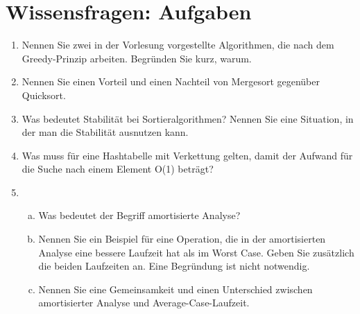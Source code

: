 \documentclass{scrartcl}
\begin{document}
\section*{Wissensfragen: Aufgaben}
\begin{enumerate}[(1)]

\item Nennen Sie zwei in der Vorlesung vorgestellte Algorithmen, die nach dem Greedy-Prinzip arbeiten. Begründen Sie kurz, warum.

\item Nennen Sie einen Vorteil und einen Nachteil von Mergesort gegenüber Quicksort.

\item Was bedeutet Stabilität bei Sortieralgorithmen? Nennen Sie eine Situation, in der man die Stabilität ausnutzen kann.

\item Was muss für eine Hashtabelle mit Verkettung gelten, damit der Aufwand für die Suche nach einem Element O(1) beträgt?

\item \begin{enumerate}[(a)]
\item Was bedeutet der Begriff \glqq amortisierte Analyse\grqq?
\item Nennen Sie ein Beispiel für eine Operation, die in der amortisierten Analyse eine bessere Laufzeit hat als im Worst Case. Geben Sie zusätzlich die beiden Laufzeiten an. Eine Begründung ist nicht notwendig.
\item Nennen Sie eine Gemeinsamkeit und einen Unterschied zwischen amortisierter Analyse und Average-Case-Laufzeit.
\end{enumerate}
\end{enumerate}
\end{document}
